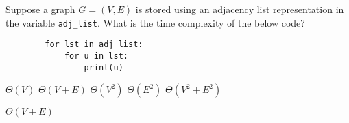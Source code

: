 \begin{prob}
    Suppose a graph $G = (V, E)$ is stored using an adjacency list representation in
    the variable \texttt{adj_list}.
    What is the time complexity of the below code?

    \begin{verbatim}
        for lst in adj_list:
            for u in lst:
                print(u)
    \end{verbatim}

    \begin{choices}
        \choice $\Theta(V)$
        \correctchoice $\Theta(V + E)$
        \choice $\Theta(V^2)$
        \choice $\Theta(E^2)$
        \choice $\Theta(V^2 + E^2)$
    \end{choices}

    \begin{soln}
        $\Theta(V + E)$
    \end{soln}

\end{prob}
